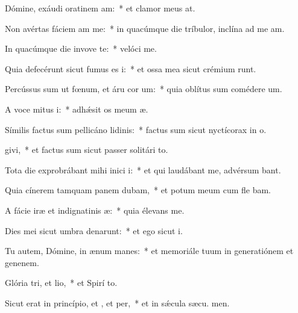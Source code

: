 \item Dómine, exáudi oratinem am:~* et clamor meus   at.
\item Non avértas fáciem am  me:~* in quacúmque die tríbulor, inclína ad me  am.
\item In quacúmque die invove te:~* velóci  me.
\item Quia defecérunt sicut fumus es i:~* et ossa mea sicut crémium runt.
\item Percússus sum ut fœnum, et áru cor um:~* quia oblítus sum comédere  um.
\item A voce mitus i:~* adhǽsit os meum  æ.
\item Símilis factus sum pellicáno lidinis:~* factus sum sicut nyctícorax in o.
\item {}givi,~* et factus sum sicut passer solitári  to.
\item Tota die exprobrábant mihi inici i:~* et qui laudábant me, advérsum  bant.
\item Quia cínerem tamquam panem dubam,~* et potum meum cum fle bam.
\item A fácie iræ et indignatinis æ:~* quia élevans  me.
\item Dies mei sicut umbra denarunt:~* et ego sicut  i.
\item Tu autem, Dómine, in ænum manes:~* et memoriále tuum in generatiónem et genenem.
\item Glória tri, et lio,~* et Spirí to.
\item Sicut erat in princípio, et , et per,~* et in sǽcula sæcu. men.
